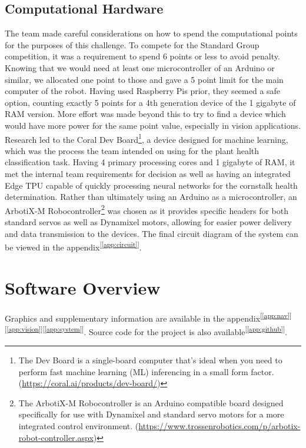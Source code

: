 \documentclass[11pt, hidelinks]{report}
\newcommand{\refapp}[1]{\textsuperscript{[\ref{#1}]}}
\begin{document}
\subsection{Computational Hardware}
The team made careful considerations on how to spend the computational points for the purposes of this challenge. To compete for the Standard Group competition, it was a requirement to spend 6 points or less to avoid penalty. Knowing that we would need at least one microcontroller of an Arduino or similar, we allocated one point to those and gave a 5 point limit for the main computer of the robot. Having used Raspberry Pis prior, they seemed a safe option, counting exactly 5 points for a 4th generation device of the 1 gigabyte of RAM version. More effort was made beyond this to try to find a device which would have more power for the same point value, especially in vision applications. Research led to the Coral Dev Board\footnote{The Dev Board is a single-board computer that's ideal when you need to perform fast machine learning (ML) inferencing in a small form factor. (\url{https://coral.ai/products/dev-board/})}, a device designed for machine learning, which was the process the team intended on using for the plant health classification task. Having 4 primary processing cores and 1 gigabyte of RAM, it met the internal team requirements for decision as well as having an integrated Edge TPU capable of quickly processing neural networks for the cornstalk health determination. Rather than ultimately using an Arduino as a microcontroller, an ArbotiX-M Robocontroller\footnote{The ArbotiX-M Robocontroller is an Arduino compatible board designed specifically for use with Dynamixel and standard servo motors for a more integrated control environment. (\url{https://www.trossenrobotics.com/p/arbotix-robot-controller.aspx})} was chosen as it provides specific headers for both standard servos as well as Dynamixel motors, allowing for easier power delivery and data transmission to the devices. The final circuit diagram of the system can be viewed in the appendix\refapp{app:circuit}.

\section{Software Overview}
Graphics and supplementary information are available in the appendix\refapp{app:nav}\refapp{app:vision}\refapp{app:system}. Source code for the project is also available\refapp{app:github}.
\end{document}
